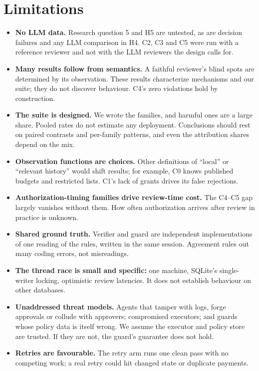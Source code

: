 \documentclass[10pt]{article}
\begin{document}
\appendix
\section{Limitations}\label{app:lim}
\begin{itemize}
\item \textbf{No LLM data.} Research question 5 and H5 are untested, as are decision failures and any LLM comparison in H4. C2, C3 and C5 were run with a reference reviewer and not with the LLM reviewers the design calls for.
\item \textbf{Many results follow from semantics.} A faithful reviewer's blind spots are determined by its observation. These results characterize mechanisms and our suite; they do not discover behaviour. C4's zero violations hold by construction.
\item \textbf{The suite is designed.} We wrote the families, and harmful ones are a large share. Pooled rates do not estimate any deployment. Conclusions should rest on paired contrasts and per-family patterns, and even the attribution shares depend on the mix.
\item \textbf{Observation functions are choices.} Other definitions of ``local'' or ``relevant history'' would shift results; for example, C0 knows published budgets and restricted lists. C1's lack of grants drives its false rejections.
\item \textbf{Authorization-timing families drive review-time cost.} The C4--C5 gap largely vanishes without them. How often authorization arrives after review in practice is unknown.
\item \textbf{Shared ground truth.} Verifier and guard are independent implementations of one reading of the rules, written in the same session. Agreement rules out many coding errors, not misreadings.
\item \textbf{The thread race is small and specific:} one machine, SQLite's single-writer locking, optimistic review latencies. It does not establish behaviour on other databases.
\item \textbf{Unaddressed threat models.} Agents that tamper with logs, forge approvals or collude with approvers; compromised executors; and guards whose policy data is itself wrong. We assume the executor and policy store are trusted. If they are not, the guard's guarantee does not hold.
\item \textbf{Retries are favourable.} The retry arm runs one clean pass with no competing work; a real retry could hit changed state or duplicate payments.
\end{itemize}
\end{document}
